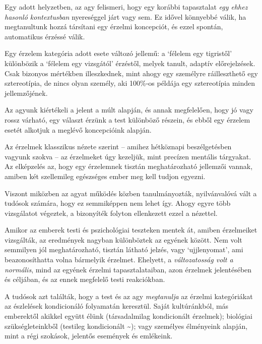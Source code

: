 Egy adott helyzetben, az agy felismeri, hogy egy korábbi tapasztalat
\emph{egy ehhez hasonló kontextusban} nyereséggel járt vagy sem. Ez
idővel könnyebbé válik, ha megtanultunk hozzá társítani egy érzelmi
koncepciót, és ezzel spontán, automatikus érzéssé válik.

Egy érzelem kategória adott esete változó jellemű: a `félelem egy
tigristől' különbözik a `félelem egy vizsgától' érzéstől, melyek tanult,
adaptív előrejelzések. Csak bizonyos mértékben illeszkednek, mint ahogy
egy személyre ráilleszthető egy sztereotípia, de nincs olyan személy,
aki 100\%-os példája egy sztereotípia minden jellemzőjének.

Az agyunk kiértékeli a jelent a múlt alapján, és annak megfelelően, hogy
jó vagy rossz várható, egy választ érzünk a test különböző részein, és
ebből egy érzelem esetét alkotjuk a meglévő koncepcióink alapján.


Az érzelmek klasszikus nézete szerint -- amihez hétköznapi
beszélgetésben vagyunk szokva -- az érzelmeket úgy kezeljük, mint
precízen mentális tárgyakat. Az elképzelés az, hogy egy érzelemnek
tisztán meghatározható jellemzői vannak, amiben két szellemileg
egészséges ember meg kell tudjon egyezni.

Viszont miközben az agyat működés közben tanulmányozták, nyilvánvalóvá
vált a tudósok számára, hogy ez semmiképpen nem lehet így. Ahogy egyre
több vizsgálatot végeztek, a bizonyíték folyton ellenkezett ezzel a
nézettel.

Amikor az emberek testi és pszichológiai teszteken mentek át, amiben
érzelmeiket vizsgálták, az eredmények nagyban különböztek az egyének
között. Nem volt semmilyen jól meghatározható, tisztán látható jelzés,
vagy `ujjlenyomat', ami beazonosíthatta volna bármelyik érzelmet.
Ehelyett, a \emph{változatosság volt a normális}, mind az egyének
érzelmi tapasztalataiban, azon érzelmek jelentésében és céljában, és az
ennek megfelelő testi reakciókban.

A tudósok azt találták, hogy a test és az agy \emph{megtanulja} az
érzelmi kategóriákat az észlelések kondicionáló folyamatán keresztül.
Saját kultúránkból, más emberektől akikkel együtt élünk (társadalmilag
kondicionált érzelmek); biológiai szükségleteinkből (testileg
kondicionált \textasciitilde); vagy személyes élményeink alapján, mint a
régi szokások, jelentős események és emlékeink.

